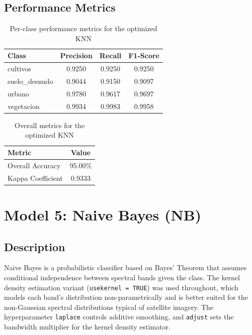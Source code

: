 \documentclass[12pt,a4paper]{article}
\begin{document}
\subsection{Performance Metrics}

\begin{table}[H]
\centering
\begin{tabular}{|m{4cm}|c|c|c|}
\hline
\textbf{Class} & \textbf{Precision} & \textbf{Recall} & \textbf{F1-Score} \\
\hline
cultivos       & 0.9250 & 0.9250 & 0.9250 \\
\hline
suelo\_desnudo & 0.9044 & 0.9150 & 0.9097 \\
\hline
urbano         & 0.9780 & 0.9617 & 0.9697 \\
\hline
vegetacion     & 0.9934 & 0.9983 & 0.9958 \\
\hline
\end{tabular}
\caption{Per-class performance metrics for the optimized KNN}
\end{table}

\begin{table}[H]
\centering
\begin{tabular}{|m{5cm}|c|}
\hline
\textbf{Metric} & \textbf{Value} \\
\hline
Overall Accuracy  & 95.00\% \\
\hline
Kappa Coefficient & 0.9333 \\
\hline
\end{tabular}
\caption{Overall metrics for the optimized KNN}
\end{table}

\section{Model 5: Naive Bayes (NB)}

\subsection{Description}

Naive Bayes is a probabilistic classifier based on Bayes' Theorem that assumes conditional independence between spectral bands given the class. The kernel density estimation variant (\texttt{usekernel = TRUE}) was used throughout, which models each band's distribution non-parametrically and is better suited for the non-Gaussian spectral distributions typical of satellite imagery. The hyperparameter \texttt{laplace} controls additive smoothing, and \texttt{adjust} sets the bandwidth multiplier for the kernel density estimator.
\end{document}

